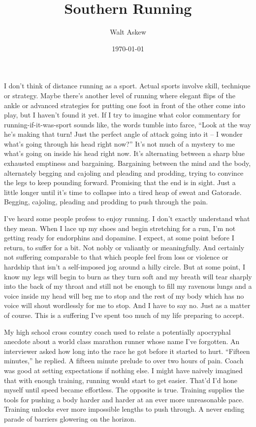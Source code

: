 \documentclass[12pt, oneside]{memoir}
\title{Southern Running}
\author{Walt Askew}
\date{\today}
\begin{document}
\maketitle

I don't think of distance running as a sport.
Actual sports involve skill, technique or strategy.
Maybe there's another level of running where elegant flips of the
ankle or advanced strategies for putting one foot in front of the
other come into play, but I haven't found it yet.
If I try to imagine what color commentary for running-if-it-was-sport
sounds like, the words tumble into farce,
``Look at the way he's making that turn! Just the perfect angle of
attack going into it -- I wonder what's going through his head right
now?''
It's not much of a mystery to me what's going on inside his head right
now. 
It's alternating between a sharp blue exhausted emptiness and
bargaining.
Bargaining between the mind and the body, alternately begging and
cajoling and pleading and prodding, trying to convince the legs to
keep pounding forward.
Promising that the end is in sight.
Just a little longer until it's time to collapse into a tired heap of
sweat and Gatorade. 
Begging, cajoling, pleading and prodding to push through the pain.

I've heard some people profess to enjoy running.
I don't exactly understand what they mean.
When I lace up my shoes and begin stretching for a run, I'm not
getting ready for endorphins and dopamine.
I expect, at some point before I return, to suffer for a bit.
Not nobly or valiantly or meaningfully.
And certainly not suffering comparable to that which people feel from
loss or violence or hardship that isn't a self-imposed jog around a
hilly circle.
But at some point, I know my legs will begin to burn as they turn
soft and my breath will tear sharply into the back of my throat and
still not be enough to fill my ravenous lungs and a voice inside my
head will beg me to stop and the rest of my body which has no voice
will shout wordlessly for me to stop.
And I have to say no.
Just as a matter of course.
This is a suffering I've spent too much of my life preparing to
accept.

My high school cross country coach used to relate a potentially
apocryphal anecdote about a world class marathon runner whose name
I've forgotten.
An interviewer asked how long into the race he got before it started
to hurt.
``Fifteen minutes,'' he replied.
A fifteen minute prelude to over two hours of pain.
Coach was good at setting expectations if nothing else.
I might have naively imagined that with enough training,
running would start to get easier.
That'd I'd hone myself until speed became effortless.
The opposite is true.
Training supplies the tools for pushing a body harder and harder at an
ever more unreasonable pace.
Training unlocks ever more impossible lengths to push through.
A never ending parade of barriers glowering on the horizon.
\end{document}
